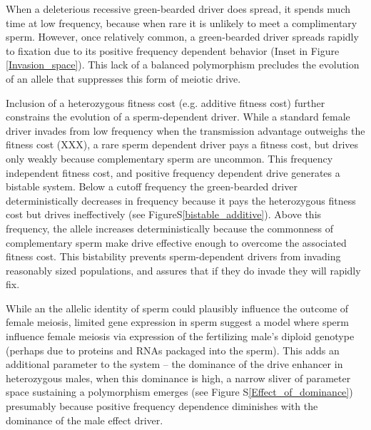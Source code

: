 \documentclass[12pt,letterpaper]{article}
\newcommand{\gc}[1]{{ \color{red} #1}}
\newcommand{\yb}[1]{{ \color{blue} #1}}
\begin{document}
When a deleterious recessive green-bearded driver does spread, 
	it spends much time at low frequency, because when rare it is unlikely to meet a complimentary sperm. 
However, once relatively common, a green-bearded driver spreads rapidly to fixation due to its
	positive frequency dependent behavior (Inset in Figure \ref{Invasion_space}).  
This lack of a balanced polymorphism precludes the evolution of an allele that suppresses this form of meiotic drive.





Inclusion of a heterozygous fitness cost (e.g. additive fitness cost) further constrains the evolution of a sperm-dependent driver. 
While a  standard female  driver invades from low frequency when the transmission advantage outweighs the fitness cost (XXX),
	a rare sperm dependent driver pays a fitness cost, but drives only weakly because complementary sperm are uncommon. 
This frequency independent fitness cost, and positive frequency dependent drive generates a bistable system. 
Below a cutoff frequency the green-bearded driver deterministically decreases in frequency 
	because it pays the  heterozygous fitness cost  but drives ineffectively (see FigureS\ref{bistable_additive}). 
Above this frequency, the allele increases deterministically because the commonness of complementary sperm 
	make drive effective enough to overcome the associated fitness cost.
This bistability prevents sperm-dependent drivers from invading 	
	reasonably sized populations, and assures that if they do invade they will rapidly fix.

While an the allelic identity of sperm could plausibly influence the outcome of female meiosis, 
	limited gene expression in sperm \citep[e.g.][]{Joseph2004}
	suggest a model where sperm influence female meiosis via expression of the fertilizing male's
	diploid genotype (perhaps due to proteins and RNAs packaged into the sperm).
This adds an additional parameter to the system -- the dominance of the drive enhancer in heterozygous males, 
	when this dominance is high, a narrow sliver of parameter space sustaining a polymorphism emerges (see Figure S\ref{Effect_of_dominance})
 	\yb{presumably because positive frequency dependence diminishes with the dominance of the male effect driver.}

\end{document}
